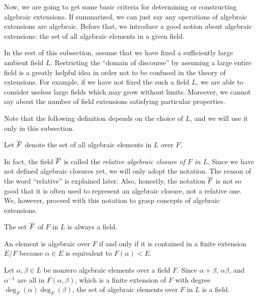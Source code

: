 \documentclass{../exp}
\begin{document}
Now, we are going to get some basic criteria for determining or constructing algebraic extensions.
If summarized, we can just say any operations of algebraic extensions are algebraic.
Before that, we introduce a good notion about algebraic extensions: the set of all algebraic elements in a given field.

In the rest of this subsection, assume that we have fixed a sufficiently large ambient field $L$.
Restricting the ``domain of discourse'' by assuming a large entire field is a greatly helpful idea in order not to be confused in the theory of extensions.
For example, if we have not fixed the such a field $L$, we are able to consider useless large fields which may grow without limits.
Moreover, we cannot say about the number of field extensions satisfying particular properties.

Note that the following definition depends on the choice of $L$, and we will use it only in this subsection.
\begin{defn}
Let $\overline F$ denote the set of all algebraic elements in $L$ over $F$.
\end{defn}
\begin{rmk}
In fact, the field $\overline F$ is called the \emph{relative algebraic closure of $F$ in $L$}.
Since we have not defined algebraic closures yet, we will only adopt the notation.
The reason of the word ``relative'' is explained later.
Also, honestly, the notation $\overline F$ is not so good that it is often used to represent an algebraic closure, not a relative one.
We, however, proceed with this notation to grasp concepts of algebraic extensions.
\end{rmk}
\begin{prop}
The set $\overline F$ of $F$ in $L$ is always a field.
\end{prop}
\begin{pf}
An element is algebraic over $F$ if and only if it is contained in a finite extension $E/F$ because $\alpha\in E$ is equivalent to $F(\alpha)<E$.

Let $\alpha,\beta\in L$ be nonzero algebraic elements over a field $F$.
Since $\alpha+\beta$, $\alpha\beta$, and $\alpha^{-1}$ are all in $F(\alpha,\beta)$, which is a finite extension of $F$ with degree $\deg_F(\alpha)\deg_F(\beta)$, the set of algebraic elements over $F$ in $L$ is a field.
\end{pf}
\end{document}
